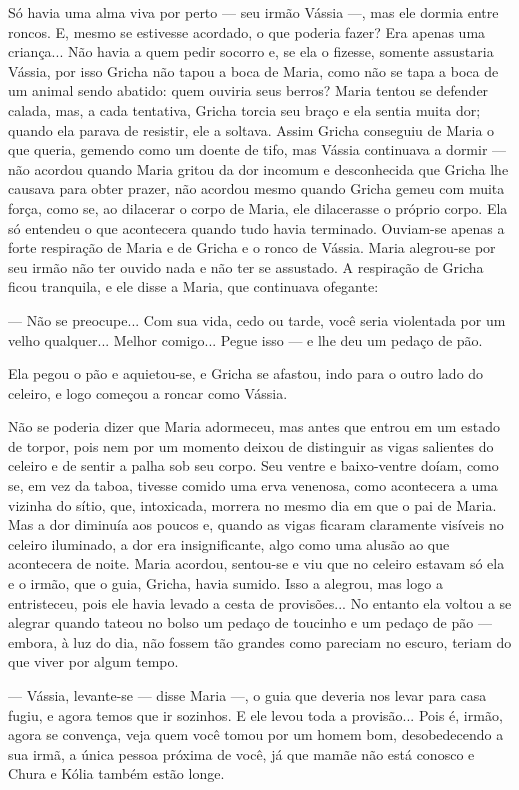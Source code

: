 Só havia uma alma viva por perto --- seu irmão Vássia ---, mas ele
dormia entre roncos. E, mesmo se estivesse acordado, o que poderia
fazer? Era apenas uma criança... Não havia a quem pedir socorro e, se
ela o fizesse, somente assustaria Vássia, por isso Gricha não tapou a
boca de Maria, como não se tapa a boca de um animal sendo abatido: quem
ouviria seus berros? Maria tentou se defender calada, mas, a cada
tentativa, Gricha torcia seu braço e ela sentia muita dor; quando ela
parava de resistir, ele a soltava. Assim Gricha conseguiu de Maria o que
queria, gemendo como um doente de tifo, mas Vássia continuava a dormir
--- não acordou quando Maria gritou da dor incomum e desconhecida que
Gricha lhe causava para obter prazer, não acordou mesmo quando Gricha
gemeu com muita força, como se, ao dilacerar o corpo de Maria, ele
dilacerasse o próprio corpo. Ela só entendeu o que acontecera quando
tudo havia terminado. Ouviam-se apenas a forte respiração de Maria e de
Gricha e o ronco de Vássia. Maria alegrou-se por seu irmão não ter
ouvido nada e não ter se assustado. A respiração de Gricha ficou
tranquila, e ele disse a Maria, que continuava ofegante:

--- Não se preocupe... Com sua vida, cedo ou tarde, você seria
violentada por um velho qualquer... Melhor comigo... Pegue isso --- e
lhe deu um pedaço de pão.

Ela pegou o pão e aquietou-se, e Gricha se afastou, indo para o outro
lado do celeiro, e logo começou a roncar como Vássia.

Não se poderia dizer que Maria adormeceu, mas antes que entrou em um
estado de torpor, pois nem por um momento deixou de distinguir as vigas
salientes do celeiro e de sentir a palha sob seu corpo. Seu ventre e
baixo-ventre doíam, como se, em vez da taboa, tivesse comido uma erva
venenosa, como acontecera a uma vizinha do sítio, que, intoxicada,
morrera no mesmo dia em que o pai de Maria. Mas a dor diminuía aos
poucos e, quando as vigas ficaram claramente visíveis no celeiro
iluminado, a dor era insignificante, algo como uma alusão ao que
acontecera de noite. Maria acordou, sentou-se e viu que no celeiro
estavam só ela e o irmão, que o guia, Gricha, havia sumido. Isso a
alegrou, mas logo a entristeceu, pois ele havia levado a cesta de
provisões... No entanto ela voltou a se alegrar quando tateou no bolso
um pedaço de toucinho e um pedaço de pão --- embora, à luz do dia, não
fossem tão grandes como pareciam no escuro, teriam do que viver por
algum tempo.

--- Vássia, levante-se --- disse Maria ---, o guia que deveria nos levar
para casa fugiu, e agora temos que ir sozinhos. E ele levou toda a
provisão... Pois é, irmão, agora se convença, veja quem você tomou por
um homem bom, desobedecendo a sua irmã, a única pessoa próxima de você,
já que mamãe não está conosco e Chura e Kólia também estão longe.

